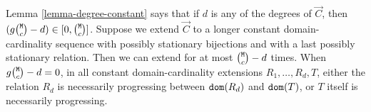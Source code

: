 \documentclass{lmcs}
\begin{document}
Lemma \ref{lemma-degree-constant} says that if $d$ is any of the degrees of
$\vec{C}$, then $(g\newton{\MaxInd}{c}-d) \in [0,\newton{\MaxInd}{c}]$.
Suppose we extend $\vec{C}$  to a longer constant domain-cardinality sequence with possibly stationary bijections and with a last possibly stationary relation. Then we can extend for at most
$\newton{\MaxInd}{c}-d$ times. When $g\newton{\MaxInd}{c}-d=0$, in 
all constant domain-cardinality extensions $R_1, \ldots, R_{d},T$, either
the relation $R_{d}$ is necessarily progressing between ${\tt dom}(R_{d})$ and ${\tt dom}(T)$,
or $T$ itself is necessarily progressing.


%



\end{document}
